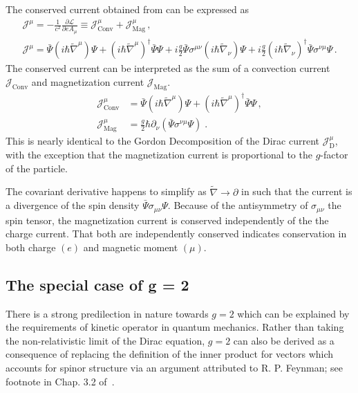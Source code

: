 The conserved current obtained from  can be expressed as
\begin{gather}
\label{norm:2}
\mathcal{J}^{\mu}=-\frac{1}{c^{2}}\frac{\partial\mathcal{L}}{\partial eA_{\mu}}\equiv 
 \mathcal{J}^\mu_{\mathrm{Conv}}+\mathcal{J}^\mu_{\mathrm{Mag}}\,, \\
\mathcal{J}^{\mu}=\bar{\Psi}\left(i\hbar{\widetilde\nabla}^{\mu}\right)\Psi + \left(i\hbar{\widetilde\nabla}^{\mu}\right)^{\dag}\bar{\Psi}\Psi + i\frac{g}{2}\bar{\Psi}\sigma^{\mu\nu}\left(i\hbar{\widetilde\nabla}_{\nu}\right)\Psi + i\frac{g}{2}\left(i\hbar{\widetilde\nabla}_{\nu}\right)^{\dag}\bar{\Psi}\sigma^{\nu\mu}\Psi\,.
\end{gather}
The conserved current  can be interpreted as the sum of a convection current $\mathcal{J}_{\mathrm{Conv}}$ and magnetization current $\mathcal{J}_{\mathrm{Mag}}$.
\begin{align}
\label{norm:3a}\mathcal{J}^{\mu}_{\mathrm{Conv}}&=\bar{\Psi}\left(i\hbar{\widetilde\nabla}^{\mu}\right)\Psi + \left(i\hbar{\widetilde\nabla}^{\mu}\right)^{\dag}\bar{\Psi}\Psi\,,\\
\label{norm:3b} 
\mathcal{J}^{\mu}_{\mathrm{Mag}}&=\frac{g}{2}\hbar{\partial}_{\nu}\left(\bar{\Psi}\sigma^{\nu\mu}\Psi\right)\;.
\end{align}
 This is nearly identical to the Gordon Decomposition of the Dirac current $\mathcal{J}_\mathrm{D}^{\mu}$, with the exception that the magnetization current is proportional to the $g$-factor of the particle.
 
The covariant derivative happens to simplify as $\widetilde\nabla\rightarrow\partial$ in  such that the current is a divergence of the spin density $\bar\Psi\sigma_{\mu\nu}\Psi$. Because of the antisymmetry of $\sigma_{\mu\nu}$ the spin tensor, the magnetization current is conserved independently of the the charge current. That both are independently conserved indicates conservation in both charge $(e)$ and magnetic moment $(\mu)$.

\subsection{The special case of g = 2}
\label{sec:unique}
There is a strong predilection in nature towards $g\!=\!2$ which can be explained by the requirements of kinetic operator in quantum mechanics. Rather than taking the non-relativistic limit of the Dirac equation, $g\!=\!2$ can also be derived as a consequence of replacing the definition of the inner product for vectors which accounts for spinor structure via an argument attributed to R. P. Feynman; see footnote in Chap. 3.2 of~\cite{sakurai1967advanced}.

